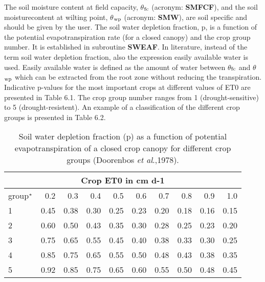 The soil moisture content at field capacity, {\bf $\theta$$_{{\rm fc}}$} (acronym: {\bf SMFCF}), 
and the soil moisturecontent at wilting point, {\bf $\theta$$_{{\rm wp}}$} (acronym: {\bf SMW}), 
are soil specific and should be given by the user. The soil water depletion fraction, p, is 
a function of the potential evapotranspir\-ation rate (for a closed canopy) and the crop group 
number. It is established in subroutine
{\bf SWEAF}. In literature, instead of the term soil water depletion fraction, also the 
expres\-sion easily available water is used. Easily available water is defined as the amount of
water between $\theta$$_{{\rm fc}}$ and $\theta$$_{{\rm wp}}$ which can be extracted from the root 
zone without reducing the
transpiration. Indicative p-values for the most important crops at different values of ET0
are presented in Table 6.1. The crop group number ranges from 1 (drought-sensitive) to 5
(drought-resistent). An example of a classification of the different crop groups is
presented in Table 6.2.

\begin{table}
\caption{Soil water depletion fraction (p) as a function of potential evapotranspira\-tion 
of a closed crop canopy for different crop groups (Doorenbos {\it et al\/}.,1978).}
\label{tbl:soilwatdeplfraction}
\begin{tabularx}{\textwidth}{Xrrrrrrrrr}
\hline
\multicolumn{10}{c}{Crop ET0 in cm d-1}\\
\hline
group$^{\rm *}$ & 0.2 & 0.3 & 0.4 & 0.5 & 0.6 & 0.7 & 0.8 & 0.9 & 1.0\\
1 & 0.45 & 0.38 & 0.30 & 0.25 & 0.23 & 0.20 & 0.18 & 0.16 & 0.15\\
2 & 0.60 & 0.50 & 0.43 & 0.35 & 0.30 & 0.28 & 0.25 & 0.23 & 0.20\\
3 & 0.75 & 0.65 & 0.55 & 0.45 & 0.40 & 0.38 & 0.33 & 0.30 & 0.25\\
4 & 0.85 & 0.75 & 0.65 & 0.55 & 0.50 & 0.48 & 0.43 & 0.38 & 0.35\\
5 & 0.92 & 0.85 & 0.75 & 0.65 & 0.60 & 0.55 & 0.50 & 0.48 & 0.45\\
\hline 
\end{tabularx} 
\end{table}


